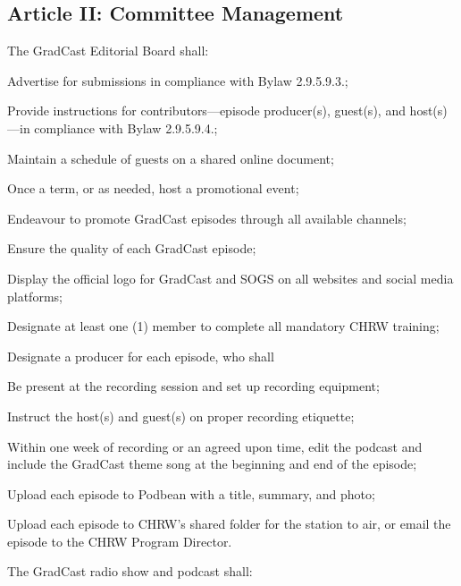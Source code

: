 \subsection{Article II: Committee Management}
\begin{longenum}[ label*=\thesubsection.\arabic*., align=left] 	
\item The GradCast Editorial Board shall:
	\begin{longenum}[label*=\arabic*., align=left]	
	\item Advertise for submissions in compliance with Bylaw 2.9.5.9.3.;
	\item Provide instructions for contributors—episode producer(s), guest(s), and host(s)—in compliance with Bylaw 2.9.5.9.4.;
	\item Maintain a schedule of guests on a shared online document;
	\item Once a term, or as needed, host a promotional event;
	\item Endeavour to promote GradCast episodes through all available channels;
	\item Ensure the quality of each GradCast episode;
	\item Display the official logo for GradCast and SOGS on all websites and social media platforms;
	\item Designate at least one (1) member to complete all mandatory CHRW training;
	\item Designate a producer for each episode, who shall
		\begin{longenum}[label*=\arabic*., align=left]
		\item Be present at the recording session and set up recording equipment;
		\item Instruct the host(s) and guest(s) on proper recording etiquette;
		\item Within one week of recording or an agreed upon time, edit the podcast and include the GradCast theme song at the beginning and end of the episode;
		\item Upload each episode to Podbean with a title, summary, and photo;
		\item Upload each episode to CHRW's shared folder for the station to air, or email the episode to the CHRW Program Director.
		\end{longenum}
	\end{longenum}
\item The GradCast radio show and podcast shall:
	\begin{longenum}[label*=\arabic*., align=left]	

\end{longenum}
\end{longenum}

